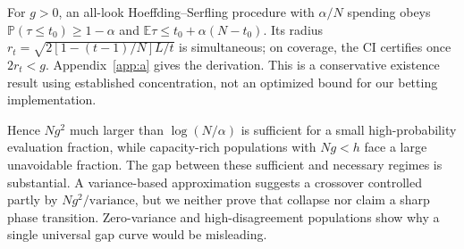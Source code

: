 For \(g>0\), an all-look Hoeffding--Serfling procedure with \(\alpha/N\) spending obeys \(\mathbb P(\tau\le t_0)\ge1-\alpha\) and \(\mathbb E\tau\le t_0+\alpha(N-t_0)\). Its radius \(r_t=\sqrt{2[1-(t-1)/N]L/t}\) is simultaneous; on coverage, the CI certifies once \(2r_t<g\). Appendix~\ref{app:a} gives the derivation. This is a conservative existence result using established concentration, not an optimized bound for our betting implementation.

Hence \(Ng^2\) much larger than \(\log(N/\alpha)\) is sufficient for a small high-probability evaluation fraction, while capacity-rich populations with \(Ng<h\) face a large unavoidable fraction. The gap between these sufficient and necessary regimes is substantial. A variance-based approximation suggests a crossover controlled partly by \(Ng^2/\mathrm{variance}\), but we neither prove that collapse nor claim a sharp phase transition. Zero-variance and high-disagreement populations show why a single universal gap curve would be misleading.
